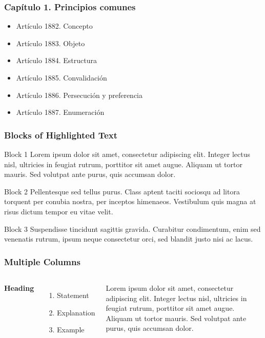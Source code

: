 \documentclass{beamer}
\begin{document}

\begin{frame}
\frametitle{Capítulo 1. Principios comunes}
\begin{itemize}
\item Artículo 1882. Concepto
\item Artículo 1883. Objeto
\item Artículo 1884. Estructura
\item Artículo 1885. Convalidación
\item Artículo 1886. Persecución y preferencia
\item Artículo 1887. Enumeración
\end{itemize}
\end{frame}


\begin{frame}
\frametitle{Blocks of Highlighted Text}
\begin{block}{Block 1}
Lorem ipsum dolor sit amet, consectetur adipiscing elit. Integer lectus nisl, ultricies in feugiat rutrum, porttitor sit amet augue. Aliquam ut tortor mauris. Sed volutpat ante purus, quis accumsan dolor.
\end{block}

\begin{block}{Block 2}
Pellentesque sed tellus purus. Class aptent taciti sociosqu ad litora torquent per conubia nostra, per inceptos himenaeos. Vestibulum quis magna at risus dictum tempor eu vitae velit.
\end{block}

\begin{block}{Block 3}
Suspendisse tincidunt sagittis gravida. Curabitur condimentum, enim sed venenatis rutrum, ipsum neque consectetur orci, sed blandit justo nisi ac lacus.
\end{block}
\end{frame}


\begin{frame}
\frametitle{Multiple Columns}
\begin{columns}[c] %

\textbf{Heading}
\begin{enumerate}
\item Statement
\item Explanation
\item Example
\end{enumerate}

Lorem ipsum dolor sit amet, consectetur adipiscing elit. Integer lectus nisl, ultricies in feugiat rutrum, porttitor sit amet augue. Aliquam ut tortor mauris. Sed volutpat ante purus, quis accumsan dolor.

\end{columns}
\end{frame}
\end{document}
